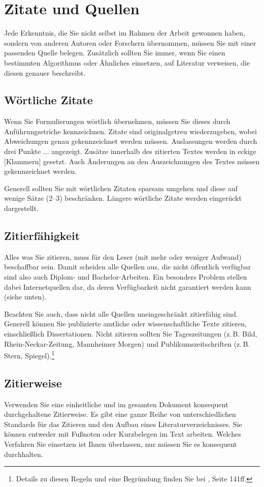 \documentclass[a4paper,11pt,headings=normal]{scrartcl}
\begin{document}
\section{Zitate und Quellen}
Jede Erkenntnis, die Sie nicht selbst im Rahmen der Arbeit gewonnen haben, sondern von anderen Autoren oder Forschern übernommen, müssen Sie mit einer passenden Quelle belegen. Zusätzlich sollten Sie immer, wenn Sie einen bestimmten Algorithmus oder Ähnliches einsetzen, auf Literatur verweisen, die diesen genauer beschreibt.

\subsection{Wörtliche Zitate}
Wenn Sie Formulierungen wörtlich übernehmen, müssen Sie dieses durch Anführungsstriche kennzeichnen. Zitate sind originalgetreu wiederzugeben, wobei Abweichungen genau gekennzeichnet werden müssen. Auslassungen werden durch drei Punkte ... angezeigt. Zusätze innerhalb des zitierten Textes werden in eckige [Klammern] gesetzt. Auch Änderungen an den Auszeichnungen des Textes müssen gekennzeichnet werden.

Generell sollten Sie mit wörtlichen Zitaten sparsam umgehen und diese auf wenige Sätze (2--3) beschränken. Längere wörtliche Zitate werden eingerückt dargestellt.

\subsection{Zitierfähigkeit}
Alles was Sie zitieren, muss für den Leser (mit mehr oder weniger Aufwand) beschaffbar sein. Damit scheiden alle Quellen aus, die nicht öffentlich verfügbar sind also auch Diplom- und Bachelor-Arbeiten. Ein besonders Problem stellen dabei Internetquellen dar, da deren Verfügbarkeit nicht garantiert werden kann (siehe unten).

Beachten Sie auch, dass nicht alle Quellen uneingeschränkt zitierfähig sind. Generell können Sie publizierte amtliche oder wissenschaftliche Texte zitieren, einschließlich Dissertationen. Nicht zitieren sollten Sie Tageszeitungen (z.\,B. Bild, Rhein-Neckar-Zeitung, Mannheimer Morgen) und Publikumszeitschriften (z.\,B. Stern, Spiegel).\footnote{Details zu diesen Regeln und eine Begründung finden Sie bei \autocite{Kramer2009}, Seite 141ff.}

\subsection{Zitierweise}
Verwenden Sie eine einheitliche und im gesamten Dokument konsequent durchgehaltene Zitierweise. Es gibt eine ganze Reihe von unterschiedlichen Standards für das Zitieren und den Aufbau eines Literaturverzeichnisses. Sie können entweder mit Fußnoten oder Kurzbelegen im Text arbeiten. Welches Verfahren Sie einsetzen ist Ihnen überlassen, nur müssen Sie es konsequent durchhalten.
\end{document}
